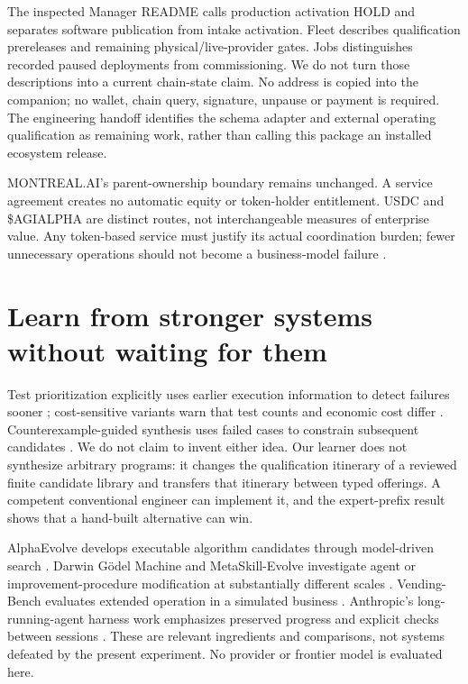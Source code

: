 \documentclass[11pt,letterpaper]{article}
\begin{document}
The inspected Manager README calls production activation HOLD and separates software publication from intake activation. Fleet describes qualification prereleases and remaining physical/live-provider gates. Jobs distinguishes recorded paused deployments from commissioning. We do not turn those descriptions into a current chain-state claim. No address is copied into the companion; no wallet, chain query, signature, unpause or payment is required. The engineering handoff identifies the schema adapter and external operating qualification as remaining work, rather than calling this package an installed ecosystem release.

MONTREAL.AI's parent-ownership boundary remains unchanged. A service agreement creates no automatic equity or token-holder entitlement. USDC and \$AGIALPHA are distinct routes, not interchangeable measures of enterprise value. Any token-based service must justify its actual coordination burden; fewer unnecessary operations should not become a business-model failure \cite{economy}.

\section{Learn from stronger systems without waiting for them}
Test prioritization explicitly uses earlier execution information to detect failures sooner \cite{rothermel}; cost-sensitive variants warn that test counts and economic cost differ \cite{elbaum}. Counterexample-guided synthesis uses failed cases to constrain subsequent candidates \cite{cegis}. We do not claim to invent either idea. Our learner does not synthesize arbitrary programs: it changes the qualification itinerary of a reviewed finite candidate library and transfers that itinerary between typed offerings. A competent conventional engineer can implement it, and the expert-prefix result shows that a hand-built alternative can win.

AlphaEvolve develops executable algorithm candidates through model-driven search \cite{alphaevolve}. Darwin G\"odel Machine and MetaSkill-Evolve investigate agent or improvement-procedure modification at substantially different scales \cite{dgm,metaskill}. Vending-Bench evaluates extended operation in a simulated business \cite{vending}. Anthropic's long-running-agent harness work emphasizes preserved progress and explicit checks between sessions \cite{harness}. These are relevant ingredients and comparisons, not systems defeated by the present experiment. No provider or frontier model is evaluated here.
\end{document}
